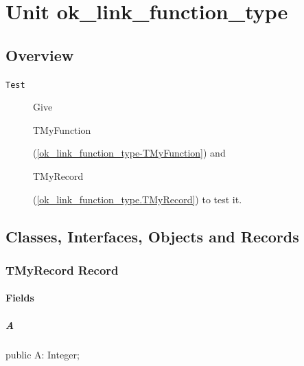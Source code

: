 \documentclass{report}
\begin{document}
\newlength{\tmplength}
\chapter{Unit ok{\_}link{\_}function{\_}type}
\section{Overview}
\begin{description}
\item[\texttt{\begin{ttfamily}TMyRecord\end{ttfamily} Record}]
\end{description}
\begin{description}
\item[\texttt{Test}]Give \begin{ttfamily}TMyFunction\end{ttfamily}(\ref{ok_link_function_type-TMyFunction}) and \begin{ttfamily}TMyRecord\end{ttfamily}(\ref{ok_link_function_type.TMyRecord}) to test it.
\end{description}
\section{Classes, Interfaces, Objects and Records}
\subsection*{TMyRecord Record}
\subsubsection*{\large{\textbf{Fields}}\normalsize\hspace{1ex}\hfill}
\paragraph*{A}\hspace*{\fill}

\begin{list}{}{
\setlength{\itemindent}{0cm}
\setlength{\listparindent}{0cm}
\setlength{\leftmargin}{\evensidemargin}
\addtolength{\leftmargin}{\tmplength}
\settowidth{\labelsep}{X}
\addtolength{\leftmargin}{\labelsep}
\setlength{\labelwidth}{\tmplength}
}
\begin{flushleft}
\item[\textbf{Declaration}\hfill]
\begin{ttfamily}
public A: Integer;\end{ttfamily}


\end{flushleft}
\end{list}
\end{document}
